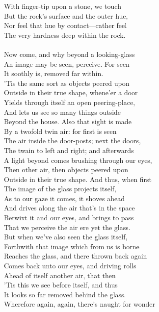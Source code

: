 With finger-tip upon a stone, we touch\\
But the rock's surface and the outer hue,\\
Nor feel that hue by contact—rather feel\\
The very hardness deep within the rock.\\
\\
Now come, and why beyond a looking-glass\\
An image may be seen, perceive. For seen\\
It soothly is, removed far within.\\
'Tis the same sort as objects peered upon\\
Outside in their true shape, whene'er a door\\
Yields through itself an open peering-place,\\
And lets us see so many things outside\\
Beyond the house. Also that sight is made\\
By a twofold twin air: for first is seen\\
The air inside the door-posts; next the doors,\\
The twain to left and right; and afterwards\\
A light beyond comes brushing through our eyes,\\
Then other air, then objects peered upon\\
Outside in their true shape. And thus, when first\\
The image of the glass projects itself,\\
As to our gaze it comes, it shoves ahead\\
And drives along the air that's in the space\\
Betwixt it and our eyes, and brings to pass\\
That we perceive the air ere yet the glass.\\
But when we've also seen the glass itself,\\
Forthwith that image which from us is borne\\
Reaches the glass, and there thrown back again\\
Comes back unto our eyes, and driving rolls\\
Ahead of itself another air, that then\\
'Tis this we see before itself, and thus\\
It looks so far removed behind the glass.\\
Wherefore again, again, there's naught for wonder

